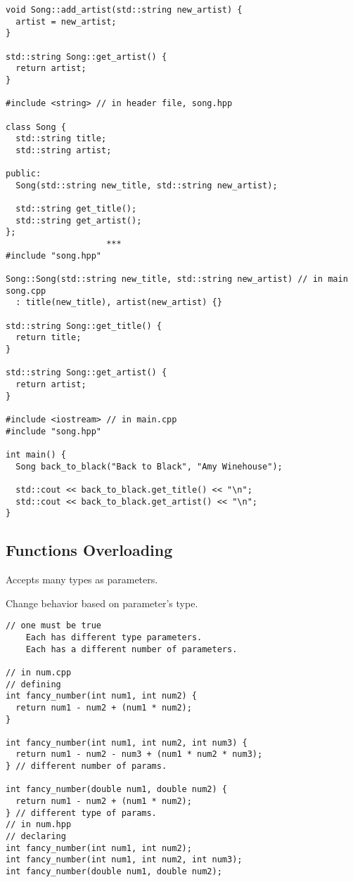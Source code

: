 \begin{verbatim}
void Song::add_artist(std::string new_artist) {
  artist = new_artist;
}

std::string Song::get_artist() {
  return artist;
}

#include <string> // in header file, song.hpp

class Song {
  std::string title;
  std::string artist;

public:
  Song(std::string new_title, std::string new_artist);

  std::string get_title();
  std::string get_artist();
};
                    ***
#include "song.hpp"

Song::Song(std::string new_title, std::string new_artist) // in main song.cpp
  : title(new_title), artist(new_artist) {}

std::string Song::get_title() {
  return title;
}

std::string Song::get_artist() {
  return artist;
}

#include <iostream> // in main.cpp
#include "song.hpp"

int main() { 
  Song back_to_black("Back to Black", "Amy Winehouse");

  std::cout << back_to_black.get_title() << "\n";
  std::cout << back_to_black.get_artist() << "\n";
}
\end{verbatim}

\subsection{Functions Overloading}

Accepts many types as parameters.

Change behavior based on parameter's type.

\begin{verbatim}
// one must be true
    Each has different type parameters.
    Each has a different number of parameters.
    
// in num.cpp 
// defining
int fancy_number(int num1, int num2) {
  return num1 - num2 + (num1 * num2);
}

int fancy_number(int num1, int num2, int num3) {
  return num1 - num2 - num3 + (num1 * num2 * num3);
} // different number of params.

int fancy_number(double num1, double num2) {
  return num1 - num2 + (num1 * num2);
} // different type of params.
// in num.hpp
// declaring
int fancy_number(int num1, int num2);
int fancy_number(int num1, int num2, int num3);
int fancy_number(double num1, double num2);

\end{verbatim}

